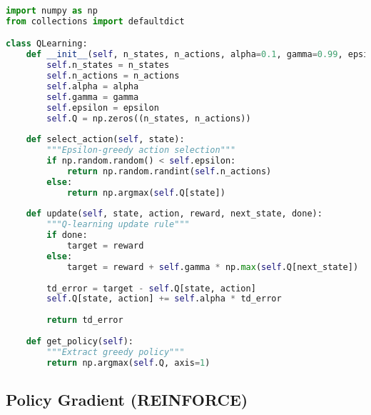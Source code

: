 \begin{lstlisting}[language=Python, caption=Q-Learning Implementation]
import numpy as np
from collections import defaultdict

class QLearning:
    def __init__(self, n_states, n_actions, alpha=0.1, gamma=0.99, epsilon=0.1):
        self.n_states = n_states
        self.n_actions = n_actions
        self.alpha = alpha
        self.gamma = gamma
        self.epsilon = epsilon
        self.Q = np.zeros((n_states, n_actions))
    
    def select_action(self, state):
        """Epsilon-greedy action selection"""
        if np.random.random() < self.epsilon:
            return np.random.randint(self.n_actions)
        else:
            return np.argmax(self.Q[state])
    
    def update(self, state, action, reward, next_state, done):
        """Q-learning update rule"""
        if done:
            target = reward
        else:
            target = reward + self.gamma * np.max(self.Q[next_state])
        
        td_error = target - self.Q[state, action]
        self.Q[state, action] += self.alpha * td_error
        
        return td_error
    
    def get_policy(self):
        """Extract greedy policy"""
        return np.argmax(self.Q, axis=1)
\end{lstlisting}

\subsection{Policy Gradient (REINFORCE)}

